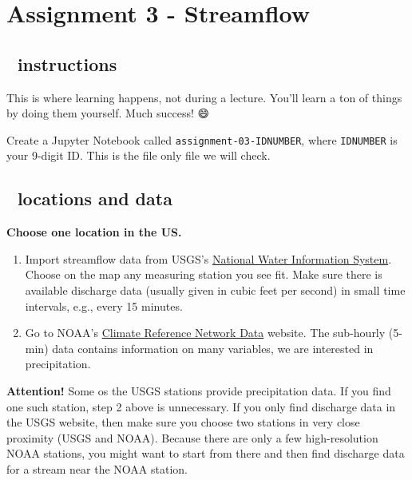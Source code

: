 \documentclass[
  letterpaper,
  DIV=11,
  numbers=noendperiod]{scrreprt}
\begin{document}
\hypertarget{assignment-3---streamflow}{%
\chapter{Assignment 3 - Streamflow}\label{assignment-3---streamflow}}

\hypertarget{instructions-2}{%
\section{📒 instructions}\label{instructions-2}}

This is where learning happens, not during a lecture. You'll learn a ton
of things by doing them yourself. Much success! 😄

Create a Jupyter Notebook called \texttt{assignment-03-IDNUMBER}, where
\texttt{IDNUMBER} is your 9-digit ID. This is the file only file we will
check.

\hypertarget{locations-and-data-1}{%
\section{📌 locations and data}\label{locations-and-data-1}}

\textbf{Choose one location in the US.}

\begin{enumerate}
\def\labelenumi{\arabic{enumi}.}
\item
  Import streamflow data from USGS's
  \href{https://maps.waterdata.usgs.gov/mapper/index.html}{National
  Water Information System}. Choose on the map any measuring station you
  see fit. Make sure there is available discharge data (usually given in
  cubic feet per second) in small time intervals, e.g., every 15
  minutes.
\item
  Go to NOAA's
  \href{https://www.ncdc.noaa.gov/crn/qcdatasets.html}{Climate Reference
  Network Data} website. The sub-hourly (5-min) data contains
  information on many variables, we are interested in precipitation.
\end{enumerate}

\textbf{Attention!} Some os the USGS stations provide precipitation
data. If you find one such station, step 2 above is unnecessary. If you
only find discharge data in the USGS website, then make sure you choose
two stations in very close proximity (USGS and NOAA). Because there are
only a few high-resolution NOAA stations, you might want to start from
there and then find discharge data for a stream near the NOAA station.
\end{document}
